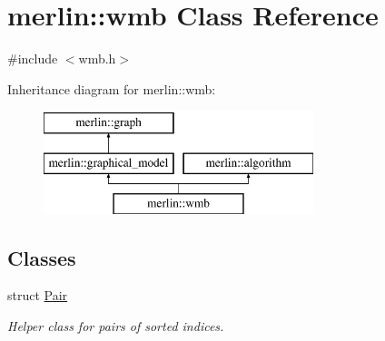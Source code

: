 \hypertarget{classmerlin_1_1wmb}{}\section{merlin\+:\+:wmb Class Reference}
\label{classmerlin_1_1wmb}


{\ttfamily \#include $<$wmb.\+h$>$}

Inheritance diagram for merlin\+:\+:wmb\+:\begin{figure}[H]
\begin{center}
\leavevmode
\includegraphics[height=3.000000cm]{classmerlin_1_1wmb}
\end{center}
\end{figure}
\subsection*{Classes}
\begin{DoxyCompactItemize}
\item 
struct \hyperlink{structmerlin_1_1wmb_1_1Pair}{Pair}
\begin{DoxyCompactList}\small\item\em Helper class for pairs of sorted indices. \end{DoxyCompactList}\end{DoxyCompactItemize}

